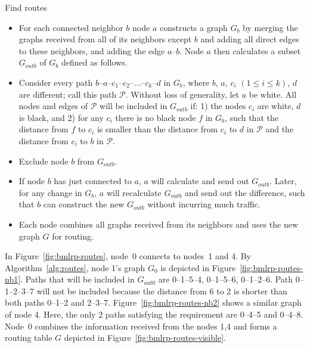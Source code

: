\documentclass[conference]{IEEEtran}
\theoremstyle{definition}
\newcommand{\cP}{{\mathcal{P}}}
\begin{document}
\begin{algorithm}[H]
    \caption{Find routes}
    
    \begin{itemize} 

        \item   For each connected neighbor $b$ node $a$ constructs a graph $G_b$ by merging the graphs received from all of its neighbors except $b$ and adding all direct edges to these neighbors, and adding the edge $a$--$b$. Node $a$ then calculates a subset $G_{outb}$ of $G_b$ defined as follows.

        \item   Consider every path $b$--$a$--$c_1$--$c_2$--...--$c_k$--$d$ in $G_b$, where $b$, $a$, $c_i$ $(1 \le i \le k)$, $d$ are different; call this path $\cP$. Without loss of generality, let $a$ be white. All nodes and edges of $\cP$ will be included in $G_{outb}$ if: 1) the nodes $c_i$ are white, $d$ is black, and 2) for any $c_i$ there is no black node $f$ in $G_b$, such that the distance from $f$ to $c_i$ is smaller than the distance from $c_i$ to $d$ in $\cP$ and the distance from $c_i$ to $b$ in $\cP$.

        \item   Exclude node $b$ from $G_{outb}$.

        \item   If node $b$ has just connected to $a$, $a$ will calculate and send out $G_{outb}$. Later, for any change in $G_b$, $a$ will recalculate $G_{outb}$ and send out the difference, such that $b$ can construct the new $G_{outb}$ without incurring much traffic.

        \item   Each node combines all graphs received from its neighbors and uses the new graph $G$ for routing.
    \end{itemize}

    \label{alg:routes}
\end{algorithm}

In Figure~\ref{fig:bmlrp-routes}, node~0 connects to nodes~1 and 4. By Algorithm~\ref{alg:routes}, node 1's graph $G_0$ is depicted in Figure~\ref{fig:bmlrp-routes-nb1}. Paths that will be included in $G_{out0}$ are 0--1--5--4, 0--1--5--6, 0--1--2--6. Path 0--1--2--3--7 will not be included because the distance from 6 to 2 is shorter than both paths 0--1--2 and 2--3--7. Figure~\ref{fig:bmlrp-routes-nb2} shows a similar graph of node 4. Here, the only 2 paths satisfying the requirement are 0--4--5 and 0--4--8. Node~0 combines the information received from the nodes 1,4 and forms a routing table $G$ depicted in Figure~\ref{fig:bmlrp-routes-visible}.
\end{document}
